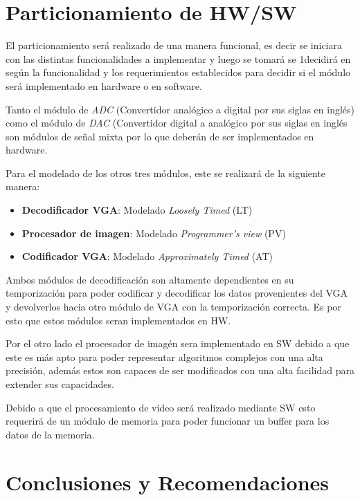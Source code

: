 \documentclass[10pt, letterpaper, conference]{IEEEtran}
\begin{document}
\section{Particionamiento de HW/SW}
\label{sec:partitioning}

El particionamiento ser\'a realizado de una manera funcional, es decir
se iniciara con las distintas funcionalidades a implementar y luego se
tomar\'a se 1decidir\'a en seg\'un la funcionalidad y los
requerimientos establecidos para decidir si el m\'odulo ser\'a
implementado en hardware o en software.

Tanto el m\'odulo de \emph{ADC} (Convertidor anal\'ogico a digital por
sus siglas en ingl\'es) como el m\'odulo de \emph{DAC} (Convertidor
digital a anal\'ogico por sus siglas en ingl\'es son m\'odulos de
señal mixta por lo que deber\'an de ser implementados en hardware.

Para el modelado de los otros tres m\'odulos, este se realizar\'a de
la siguiente manera:

\begin{itemize}
    \item \textbf{Decodificador VGA}: Modelado \emph{Loosely Timed} (LT)
    \item \textbf{Procesador de imagen}: Modelado \emph{Programmer's view} (PV)
    \item \textbf{Codificador VGA}: Modelado \emph{Approximately Timed} (AT)
\end{itemize}

Ambos m\'odulos de decodificaci\'on son altamente dependientes en su
temporizaci\'on para poder codificar y decodificar los datos
provenientes del VGA y devolverlos hacia otro m\'odulo de VGA con la
temporizaci\'on correcta. Es por esto que estos m\'odulos seran
implementados en HW.

Por el otro lado el procesador de imag\'en sera implementado en SW
debido a que este es m\'as apto para poder representar algoritmos
complejos con una alta precisi\'on, adem\'as estos son capaces de ser
modificados con una alta facilidad para extender sus capacidades.

Debido a que el procesamiento de video ser\'a realizado mediante SW
esto requerir\'a de un m\'odulo de memoria para poder funcionar un
buffer para los datos de la memoria.

\section{Conclusiones y Recomendaciones}





 

\end{document}
